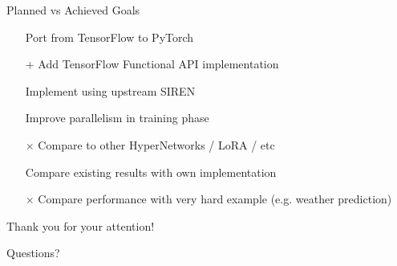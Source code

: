 \documentclass{beamer}
\begin{document}

\begin{frame}{Planned vs Achieved Goals}
    \begin{itemize}
        \item[\checkmark] Port from TensorFlow to PyTorch
        \item[+] Add TensorFlow Functional API implementation
        \item[\checkmark] Implement using upstream SIREN
        \item[\checkmark] Improve parallelism in training phase
        \item[$\times$] Compare to other HyperNetworks / LoRA / etc
        \item[\checkmark] Compare existing results with own implementation
        \item[$\times$] Compare performance with very hard example (e.g. weather prediction)
    \end{itemize}
\end{frame}


\begin{frame}
    \centering
    \Huge Thank you for your attention!
    
    \vspace{1cm}
    \Large Questions?
\end{frame}
\end{document}
